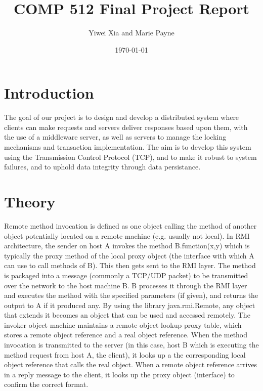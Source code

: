 \documentclass[letterpaper,12pt]{article}
\begin{document}
	
	\title{COMP 512 Final Project Report}
	\author{Yiwei Xia and Marie Payne}
	\date{\today}
	\maketitle
	
	\pagebreak
	
	\section{Introduction}
	
	The goal of our project is to design and develop a distributed system where clients can make requests and servers deliver responses based upon them, with the use of a middleware server, as well as servers to manage the locking mechanisms and transaction implementation. The aim is to develop this system using the Transmission Control Protocol (TCP), and to make it robust to system failures, and to uphold data integrity through data persistance.
	
	\section{Theory}
	Remote method invocation is defined as one object calling the method of another object potentially located on a remote machine (e.g. usually not local). In RMI architecture, the sender on host A invokes the method B.function(x,y) which is typically the proxy method of the local proxy object (the interface with which A can use to call methods of B). This then gets sent to the RMI layer. The method is packaged into a message (commonly a TCP/UDP packet) to be transmitted over the network to the host machine B. B processes it through the RMI layer and executes the method with the specified parameters (if given), and returns the output to A if it produced any. By using the library java.rmi.Remote, any object that extends it becomes an object that can be used and accessed remotely. The invoker object machine maintains a remote object lookup proxy table, which stores a remote object reference and a real object reference. When the method invocation is transmitted to the server (in this case, host B which is executing the method request from host A, the client), it looks up a the corresponding local object reference that calls the real object. When a remote object reference arrives in a reply message to the client, it looks up the proxy object (interface) to confirm the correct format. \\
	
\end{document}
